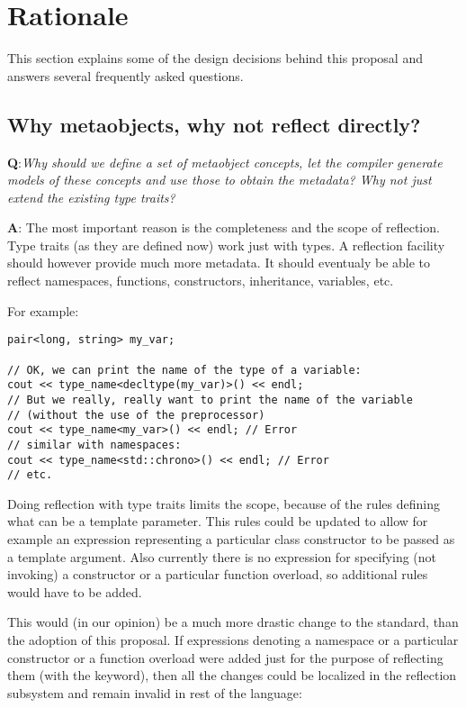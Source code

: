 \section{Rationale}

This section explains some of the design decisions behind this proposal and
answers several frequently asked questions.

\subsection{Why metaobjects, why not reflect directly?}

{\textbf Q:}{\em Why should we define a set of metaobject concepts, let the compiler generate
models of these concepts and use those to obtain the metadata? Why not just extend the existing
type traits?}

{\textbf A:} The most important reason is the completeness and the scope of reflection.
Type traits (as they are defined now) work just with types. A reflection facility should
however provide much more metadata.
It should eventualy be able to reflect namespaces, functions, constructors, inheritance, variables, etc.

For example:

\begin{verbatim}
pair<long, string> my_var;

// OK, we can print the name of the type of a variable:
cout << type_name<decltype(my_var)>() << endl;
// But we really, really want to print the name of the variable
// (without the use of the preprocessor)
cout << type_name<my_var>() << endl; // Error
// similar with namespaces:
cout << type_name<std::chrono>() << endl; // Error
// etc.
\end{verbatim}


Doing reflection with type traits limits the scope, because of the rules defining what
can be a template parameter. This rules could be updated to allow for example an expression
representing a particular class constructor to  be passed as a template argument.
Also currently there is no expression for specifying (not invoking) a constructor
or a particular function overload, so additional rules would have to be added.

This would (in our opinion) be a much more drastic change to the standard, than
the adoption of this proposal. If expressions denoting a namespace or a particular
constructor or a function overload were added just for the purpose of reflecting
them (with the \verb@mirrored@ keyword), then all the changes could be localized
in the reflection subsystem and remain invalid in rest of the language:

